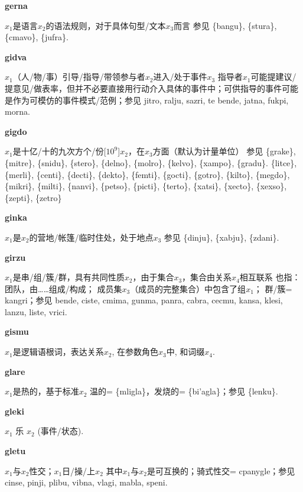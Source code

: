 \documentclass[notitlepage,twocolumn,a4paper,10pt]{book}
\begin{document}
{{\sffamily\bfseries gerna}\enspace {\ttfamily\bfseries[gen     ge'a]}  $x_1$是语言$x_2$的语法规则，对于具体句型\slash{}文本$x_3$而言 \textemdash{} 参见 \{bangu\}, \{stura\}, \{cmavo\}, \{jufra\}.

{\sffamily\bfseries gidva}\enspace {\ttfamily\bfseries[gid     gi'a]}  $x_1$（人\slash{}物\slash{}事）引导\slash{}指导\slash{}带领参与者$x_2$进入\slash{}处于事件$x_3$ \textemdash{} 指导者$x_1$可能提建议\slash{}提意见\slash{}做表率，但并不必要直接用行动介入具体的事件中；可供指导的事件可能是作为可模仿的事件模式\slash{}范例；参见 {jitro}, {ralju}, {sazri}, te {bende}, {jatna}, {fukpi}, {morna}.

{\sffamily\bfseries gigdo}\enspace {\ttfamily\bfseries[gig     gi'o]}  $x_1$是十亿\slash{}十的九次方个\slash{}份[$10^{9}$]$x_2$，在$x_3$方面（默认为计量单位） \textemdash{} 参见 \{grake\}, \{mitre\}, \{snidu\}, \{stero\}, \{delno\}, \{molro\}, \{kelvo\}, \{xampo\}, \{gradu\}. \{litce\}, \{merli\}, \{centi\}, \{decti\}, \{dekto\}, \{femti\}, \{gocti\}, \{gotro\}, \{kilto\}, \{megdo\}, \{mikri\}, \{milti\}, \{nanvi\}, \{petso\}, \{picti\}, \{terto\}, \{xatsi\}, \{xecto\}, \{xexso\}, \{zepti\}, \{zetro\}

{\sffamily\bfseries ginka}\enspace {\ttfamily\bfseries[gik]}  $x_1$是$x_2$的营地\slash{}帐篷\slash{}临时住处，处于地点$x_3$ \textemdash{} 参见 \{dinju\}, \{xabju\}, \{zdani\}.

{\sffamily\bfseries girzu}  $x_1$是串\slash{}组\slash{}簇\slash{}群，具有共同性质$x_2$，由于集合$x_3$，集合由关系$x_4$相互联系 \textemdash{} 也指：团队，由……组成\slash{}构成； 成员集$x_3$（成员的完整集合）中包含了组$x_1$； 群\slash{}簇= {kangri}；参见 {bende}, {ciste}, {cmima}, {gunma}, {panra}, {cabra}, {cecmu}, {kansa}, {klesi}, {lanzu}, {liste}, {vrici}.

{\sffamily\bfseries gismu}\enspace {\ttfamily\bfseries[gim     gi'u]}  $x_1$是逻辑语根词，表达关系$x_2$, 在参数角色$x_3$中,  和词缀$x_4$.

{\sffamily\bfseries glare}\enspace {\ttfamily\bfseries[    gla]}  $x_1$是热的，基于标准$x_2$ \textemdash{} 温的= \{mligla\}，发烧的= \{bi'agla\}；参见 \{lenku\}.

{\sffamily\bfseries gleki}  $x_1$ 乐 $x_2$ (事件\slash{}状态).

{\sffamily\bfseries gletu}  $x_1$与$x_2$性交；$x_1$日\slash{}操\slash{}上$x_2$ \textemdash{} 其中$x_1$与$x_2$是可互换的；骑式性交= {cpanygle}；参见 {cinse}, {pinji}, {plibu}, {vibna}, {vlagi}, {mabla}, {speni}.

}
\end{document}
